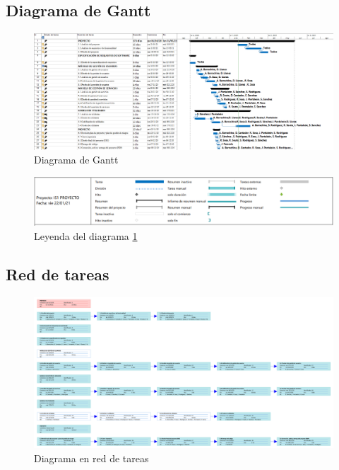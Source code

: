 \newpage
\begin{landscape}
	\subsection{Diagrama de Gantt}
	\begin{figure}[H]
		\centering
		\includegraphics[width = 1.5\textwidth]{images/gantt.png}
		\caption{Diagrama de Gantt}
		\label{fig:gantt}
	\end{figure}
	\begin{figure}[H]
		\centering
		\includegraphics[width = \textwidth]{images/gantt_leyenda.PNG}
		\caption{Leyenda del diagrama \ref{fig:gantt}}
	\end{figure}
	\subsection{Red de tareas}
	\begin{figure}[H]
		\centering
		\includegraphics[width=1.5\textwidth]{images/Diagrama_Red.png}
		\caption{Diagrama en red de tareas}
	\end{figure}
\end{landscape}


